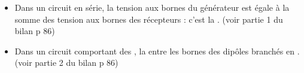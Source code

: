 \begin{mybilan}
	
	\begin{itemize}

		\item Dans un circuit en série, la tension aux bornes du générateur est égale à la somme des tension aux bornes des récepteurs : c'est la . (voir partie 1 du bilan p 86)\pause
			
			
		\item Dans un circuit comportant des , la  entre les bornes des dipôles branchés en .(voir partie 2 du bilan p 86)
		
		
		
	\end{itemize}
\end{mybilan}
